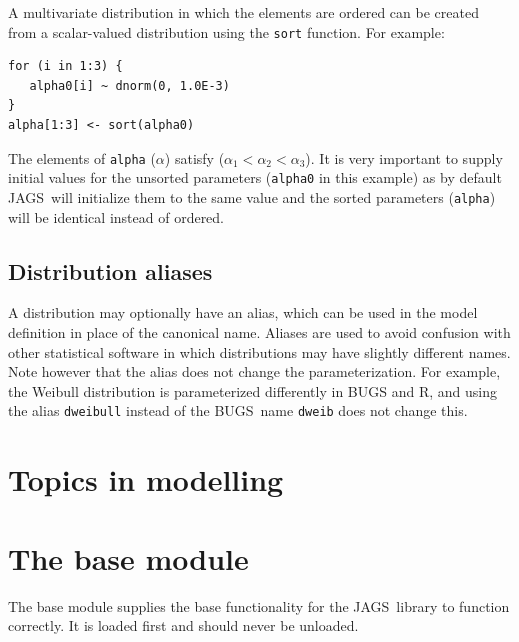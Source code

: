 \documentclass[11pt, a4paper, titlepage]{report}
\newcommand{\JAGS}{\textsf{JAGS}}
\newcommand{\BUGS}{\textsf{BUGS}}
\newcommand{\R}{\textsf{R}}
\begin{document}
A multivariate distribution in which the elements are ordered can be
created from a scalar-valued distribution using the \texttt{sort}
function. For example:
\begin{verbatim}
for (i in 1:3) {
   alpha0[i] ~ dnorm(0, 1.0E-3)
}
alpha[1:3] <- sort(alpha0)
\end{verbatim}
The elements of \texttt{alpha} ($\alpha$) satisfy ($\alpha_1 <
\alpha_2 < \alpha_3$). It is very important to supply initial values
for the unsorted parameters (\texttt{alpha0} in this example) as by
default \JAGS\ will initialize them to the same value and the sorted
parameters (\texttt{alpha}) will be identical instead of ordered.

\section{Distribution aliases}

A distribution may optionally have an alias, which can be used in the
model definition in place of the canonical name. Aliases are used to
avoid confusion with other statistical software in which distributions
may have slightly different names. Note however that the alias does
not change the parameterization. For example, the Weibull distribution
is parameterized differently in BUGS and \R, and using the alias
\texttt{dweibull} instead of the \BUGS\ name \texttt{dweib} does not
change this.

\chapter{Topics in modelling}





\chapter{The base module}

The base module supplies the base functionality for the \JAGS\ library
to function correctly. It is loaded first and should never be
unloaded.
\end{document}
